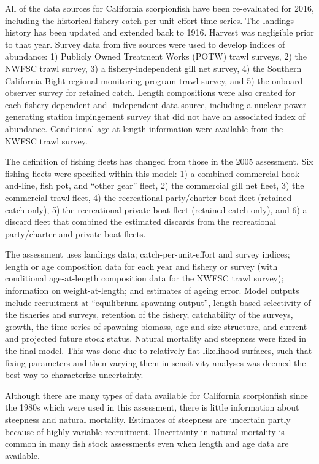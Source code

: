 \documentclass[12pt,]{article}
\begin{document}
All of the data sources for California scorpionfish have been
re-evaluated for 2016, including the historical fishery catch-per-unit
effort time-series. The landings history has been updated and extended
back to 1916. Harvest was negligible prior to that year. Survey data
from five sources were used to develop indices of abundance: 1) Publicly
Owned Treatment Works (POTW) trawl surveys, 2) the NWFSC trawl survey,
3) a fishery-independent gill net survey, 4) the Southern California
Bight regional monitoring program trawl survey, and 5) the onboard
observer survey for retained catch. Length compositions were also
created for each fishery-dependent and -independent data source,
including a nuclear power generating station impingement survey that did
not have an associated index of abundance. Conditional age-at-length
information were available from the NWFSC trawl survey.

The definition of fishing fleets has changed from those in the 2005
assessment. Six fishing fleets were specified within this model: 1) a
combined commercial hook-and-line, fish pot, and ``other gear'' fleet,
2) the commercial gill net fleet, 3) the commercial trawl fleet, 4) the
recreational party/charter boat fleet (retained catch only), 5) the
recreational private boat fleet (retained catch only), and 6) a discard
fleet that combined the estimated discards from the recreational
party/charter and private boat fleets.

The assessment uses landings data; catch-per-unit-effort and survey
indices; length or age composition data for each year and fishery or
survey (with conditional age-at-length composition data for the NWFSC
trawl survey); information on weight-at-length; and estimates of ageing
error. Model outputs include recruitment at ``equilibrium spawning
output'', length-based selectivity of the fisheries and surveys,
retention of the fishery, catchability of the surveys, growth, the
time-series of spawning biomass, age and size structure, and current and
projected future stock status. Natural mortality and steepness were
fixed in the final model. This was done due to relatively flat
likelihood surfaces, such that fixing parameters and then varying them
in sensitivity analyses was deemed the best way to characterize
uncertainty.

Although there are many types of data available for California
scorpionfish since the 1980s which were used in this assessment, there
is little information about steepness and natural mortality. Estimates
of steepness are uncertain partly because of highly variable
recruitment. Uncertainty in natural mortality is common in many fish
stock assessments even when length and age data are available.
\end{document}
